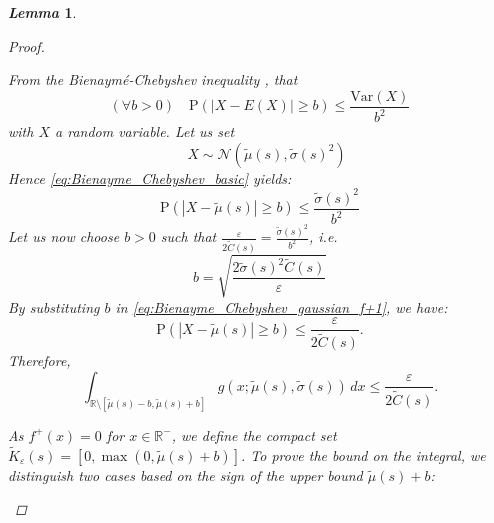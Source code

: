 \documentclass[review]{elsarticle}
\newtheorem{lemma}{\em Lemma}
\begin{document}
\begin{lemma}
\begin{proof}
\begin{enumerate}
    From the Bienaymé-Chebyshev inequality \cite{BertsekasTsitsiklis}, that 
    \begin{equation} \label{eq:Bienayme_Chebyshev_basic}
   (\forall b > 0) \quad \mathrm{P}(|X - E(X)| \geq b) \leq \frac{\mathrm{Var}(X)}{b^2}
    \end{equation}
    with $X$ a random variable. Let us set
    \begin{equation}
     \quad X \sim \mathcal{N}(\widetilde{\mu}(s), \widetilde{\sigma}(s)^2)
    \end{equation}
    Hence \eqref{eq:Bienayme_Chebyshev_basic} yields:
    \begin{equation} \label{eq:Bienayme_Chebyshev_gaussian_f+1}
     \mathrm{P}(|X - \widetilde{\mu}(s)| \geq b) \leq \frac{\widetilde{\sigma}(s)^2}{b^2}
    \end{equation}
Let us now choose $b > 0$ such that $\frac{\varepsilon}{2\widetilde{C}(s)} = \frac{\widetilde{\sigma}(s)^2}{b^2}$, i.e.
    \begin{equation}
    b = \sqrt{\frac{2 \widetilde{\sigma}(s)^2 \widetilde{C}(s)}{\varepsilon}}
    \end{equation}
    By substituting $b$ in \eqref{eq:Bienayme_Chebyshev_gaussian_f+1}, we have:
    \begin{equation} \label{eq:Bienayme_Chebyshev_gaussian_f+2}
     \mathrm{P}(|X - \widetilde{\mu}(s)| \geq b) \leq \frac{\varepsilon}{2\widetilde{C}(s)}.
    \end{equation}    
    Therefore, 
    \begin{equation}
    \label{eq:cheby_principle}
    \int_{\mathbb{R} \setminus [\widetilde{\mu}(s) - b, \widetilde{\mu}(s) + b]}  g(x; \widetilde{\mu}(s), \widetilde{\sigma}(s)) \, dx \leq \frac{\varepsilon}{2\widetilde{C}(s)}.
    \end{equation} 

  As $f^+(x) = 0$ for $x \in \mathbb{R}^-$, we define the compact set $\widetilde{K}_{\varepsilon}(s) = [0, \max(0, \widetilde{\mu}(s) + b)]$. To prove the bound on the integral, we distinguish two cases based on the sign of the upper bound $\widetilde{\mu}(s) + b$:


\end{enumerate}
\end{proof}
\end{lemma}
\end{document}
